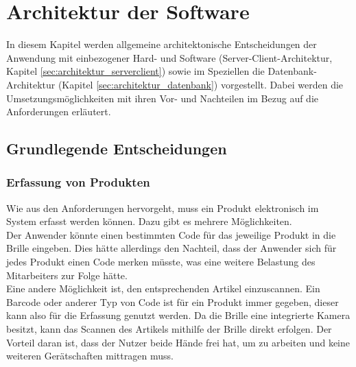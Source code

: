 \chapter{Architektur der Software}
\label{cha:architektur}
\sloppy

In diesem Kapitel werden allgemeine architektonische Entscheidungen der Anwendung mit einbezogener Hard- und Software (Server-Client-Architektur, Kapitel \ref{sec:architektur_serverclient}) sowie im Speziellen die Datenbank-Architektur (Kapitel \ref{sec:architektur_datenbank}) vorgestellt. Dabei werden die Umsetzungsmöglichkeiten mit ihren Vor- und Nachteilen im Bezug auf die Anforderungen erläutert.

\section{Grundlegende Entscheidungen}
\label{sec:grund_entscheidungen}

\subsection{Erfassung von Produkten}
Wie aus den Anforderungen hervorgeht, muss ein Produkt elektronisch im System erfasst werden können. Dazu gibt es mehrere Möglichkeiten.\\ 
Der Anwender könnte einen bestimmten Code für das jeweilige Produkt in die Brille eingeben. Dies hätte allerdings den Nachteil, dass der Anwender sich für jedes Produkt einen Code merken müsste, was eine weitere Belastung des Mitarbeiters zur Folge hätte.\\
Eine andere Möglichkeit ist, den entsprechenden Artikel einzuscannen. Ein Barcode oder anderer Typ von Code ist für ein Produkt immer gegeben, dieser kann also für die Erfassung genutzt werden. Da die Brille eine integrierte Kamera besitzt, kann das Scannen des Artikels mithilfe der Brille direkt erfolgen. Der Vorteil daran ist, dass der Nutzer beide Hände frei hat, um zu arbeiten und keine weiteren Gerätschaften mittragen muss.

